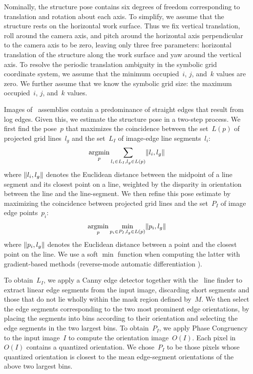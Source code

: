 Nominally, the structure pose contains six degrees of freedom corresponding to
translation and rotation about each axis.
%
To simplify, we assume that the structure rests on the horizontal work surface.
%
Thus we fix vertical translation, roll around the camera axis, and pitch around
the horizontal axis perpendicular to the camera axis to be zero, leaving only
three free parameters: horizontal translation of the structure along the work
surface and yaw around the vertical axis.
%
To resolve the periodic translation ambiguity in the symbolic grid coordinate
system, we assume that the minimum occupied~$i$, $j$, and~$k$ values are
zero.
%
We further assume that we know the symbolic grid size: the maximum
occupied~$i$, $j$, and~$k$ values.

Images of \LincolnLog\ assemblies contain a predominance of straight edges that
result from log edges.
%
Given this, we estimate the structure pose in a two-step process.
%
We first find the pose~$p$ that maximizes the coincidence between the
set~$L(p)$ of projected grid lines~$l_g$ and the set~$L_I$ of image-edge
line segments~$l_i$:
%
\[\operatorname*{argmin}_p\sum_{l_i\in L_I,l_g\in L(p)}\lVert l_i,l_g\rVert\]
%
where $\lVert l_i,l_g\rVert$ denotes the Euclidean distance between the midpoint of a
line segment and its closest point on a line, weighted by the disparity in
orientation between the line and the line-segment.
%
We then refine this pose estimate by maximizing the coincidence between
projected grid lines and the set~$P_I$ of image edge points~$p_i$:
%
\[\operatorname*{argmin}_p\min_{p_i \in P_I,l_g \in L(p)}\lVert p_i,l_g\rVert\]
%
where $\lVert p_i,l_g\rVert$ denotes the Euclidean distance between a point and the
closest point on the line.
%
We use a soft $\min$ function \cite{Smale1986,Chen1993,Kanzow1996} when
computing the latter with gradient-based methods (reverse-mode automatic
differentiation \cite{Speelpenning1980}).

%
To obtain~$L_I$, we apply a Canny edge detector \cite{Canny1986} together with
the \Khoros\ line finder \cite{Konstantinides1994} to extract linear edge
segments from the input image, discarding short segments and those that do not
lie wholly within the mask region defined by~$M$.
%
%
We then select the edge segments corresponding to the two most prominent edge
orientations, by placing the segments into bins according to their orientation
and selecting the edge segments in the two largest bins.
%
%
To obtain~$P_I$, we apply Phase Congruency \cite{Kovesi1999} to the input
image~$I$ to compute the orientation image~$O(I)$.
%
Each pixel in~$O(I)$ contains a quantized orientation.
%
We chose~$P_I$ to be those pixels whose quantized orientation is closest to the
mean edge-segment orientations of the above two largest bins.

